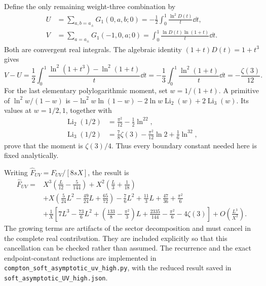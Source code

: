 Define the only remaining weight-three combination by
\begin{align}
 U&=\sum_{a,b=a_\pm}G_1(0,a,b;0)
                 =-\frac12\int_0^1\frac{\ln^2D(t)}t\dd t,\\
 V&=\sum_{a=a_\pm}G_1(-1,0,a;0)
                 =\int_0^1\frac{\ln D(t)\ln(1+t)}t\dd t.
\end{align}
Both are convergent real integrals.  The algebraic identity
$(1+t)D(t)=1+t^3$ gives
\begin{equation}
 V-U=\frac12\int_0^1
 \frac{\ln^2(1+t^3)-\ln^2(1+t)}t\dd t
 =-\frac13\int_0^1\frac{\ln^2(1+t)}t\dd t
 =-\frac{\zeta(3)}{12}.
\end{equation}
For the last elementary polylogarithmic moment, set $w=1/(1+t)$.
A primitive of $\ln^2w/(1-w)$ is
$-\ln^2w\ln(1-w)-2\ln w\operatorname{Li}_2(w)+2\operatorname{Li}_3(w)$.
Its values at $w=1/2,1$, together with
\begin{align}
 \operatorname{Li}_2(1/2)&=\frac{\pi^2}{12}-\frac12\ln^22,\\
 \operatorname{Li}_3(1/2)&=\frac78\zeta(3)-\frac{\pi^2}{12}\ln2
                                      +\frac16\ln^32,
\end{align}
prove that the moment is $\zeta(3)/4$.  Thus every boundary constant
needed here is fixed analytically.

Writing $\widehat F_{UV}=F_{UV}/[8s X]$, the result is
\begin{align}
 \widehat F_{UV}={}&X^3\left(\frac L{12}-\frac5{144}\right)
 +X^2\left(\frac L3+\frac1{18}\right)\\
 &+X\left(\frac5{24}L^2-\frac{49}{24}L+\frac{65}{72}\right)
 -\frac76L^2+\frac{11}{3}L+\frac{47}{36}+\frac{\pi^2}{6}\\
 &+\frac1X\left[7L^3-\frac{73}{6}L^2
 +\left(\frac{133}{8}-\frac{\pi^2}{3}\right)L
 +\frac{2335}{144}-\frac{\pi^2}{6}-4\zeta(3)\right]
 +O\!\left(\frac{L^3}{X^2}\right).
\end{align}
The growing terms are artifacts of the sector decomposition and must
cancel in the complete real contribution.  They are included explicitly
so that this cancellation can be checked rather than assumed.
The recurrence and the exact endpoint-constant reductions are implemented
in \nolinkurl{compton_soft_asymptotic_uv_high.py}, with the reduced result
saved in \nolinkurl{soft_asymptotic_UV_high.json}.

